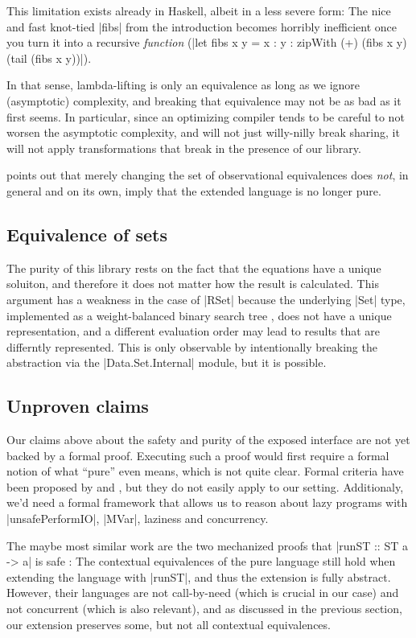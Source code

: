 \documentclass[manuscript,review,screen,acmsmall]{acmart}
\begin{document}
This limitation exists already in Haskell, albeit in a less severe form: The nice and fast knot-tied |fibs| from the introduction becomes horribly inefficient once you turn it into a recursive \emph{function} (|let fibs x y = x : y  : zipWith (+) (fibs x y) (tail (fibs x y))|).

In that sense, lambda-lifting is only an equivalence as long as we ignore (asymptotic) complexity, and breaking that equivalence may not be as bad as it first seems.
In particular, since an optimizing compiler tends to be careful to not worsen the asymptotic complexity, and will not just willy-nilly break sharing, it will not apply transformations that break in the presence of our library.

 points out that merely changing the set of observational equivalences does \emph{not}, in general and on its own, imply that the extended language is no longer pure.

\subsection{Equivalence of sets}

The purity of this library rests on the fact that the equations have a unique soluiton, and therefore it does not matter how the result is calculated. This argument has a weakness in the case of |RSet| because the underlying |Set| type, implemented as a weight-balanced binary search tree \citep{adams-tr,nievergelt}, does not have a unique representation, and a different evaluation order may lead to results that are differntly represented. This is only observable by intentionally breaking the abstraction via the |Data.Set.Internal| module, but it is possible.

\subsection{Unproven claims}

Our claims above about the safety and purity of the exposed interface are not yet backed by a formal proof. Executing such a proof would first require a formal notion of what “pure” even means, which is not quite clear. Formal criteria have been proposed by \citet{sabry} and \citet{longley}, but they do not easily apply to our setting. Additionaly, we’d need a formal framework that allows us to reason about lazy programs with |unsafePerformIO|, |MVar|, laziness and concurrency.

The maybe most similar work are the two mechanized proofs that |runST :: ST a -> a| is safe \citep{runST,runST2}: The contextual equivalences of the pure language still hold when extending the language with |runST|, and thus the extension is fully abstract.  However, their languages are not call-by-need (which is crucial in our case) and not concurrent (which is also relevant), and as discussed in the previous section, our extension preserves some, but not all contextual equivalences.
\end{document}
